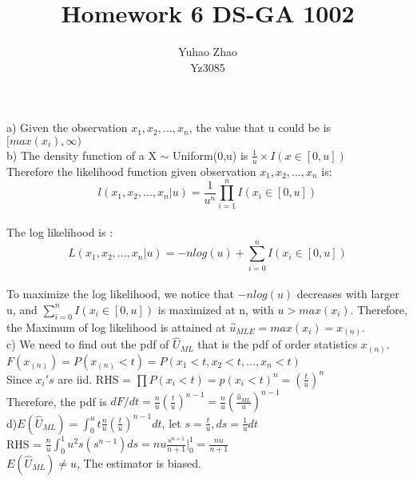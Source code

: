 \documentclass[11pt]{article}
\newenvironment{problem}[2][Problem]{\begin{trivlist}
\item[\hskip \labelsep {\bfseries #1}\hskip \labelsep {\bfseries #2.}]}{\end{trivlist}}
\begin{document}
 
 
\title{Homework 6 DS-GA 1002 }%
\author{Yuhao Zhao\\ %
Yz3085} %
 
\maketitle
\begin{problem}{1}
\end{problem}
a) Given the observation $x_1,x_2,...,x_n$, the value that u could be is $[max(x_i),\infty)$\\

b) The density function of a X $\sim$ Uniform(0,u) is $\frac{1}{u}\times I(x\in[0,u])$\\
Therefore the likelihood function given observation  $x_1,x_2,...,x_n$ is:$$l(x_1,x_2,...,x_n|u) = \frac{1}{u^n} \prod_{i=1}^{n} I(x_i \in [0,u])$$ \\
The log likelihood is :$$L(x_1,x_2,...,x_n|u) = -nlog(u) + \sum_{i=0}^{n} I(x_i \in [0,u]) $$\\
To maximize the log likelihood, we notice that $-nlog(u)$ decreases with larger u, and $\sum_{i=0}^{n} I(x_i \in [0,u])$ is maximized at n, with $u > max(x_i)$. Therefore, the Maximum of log likelihood is attained at  $\hat{u}_{MLE} = max(x_i) = x_{(n)}$.\\

c) We need to find out the pdf of $\hat{U}_{ML}$ that is the pdf of order statistics $x_{(n)}$.\\
$F(x_{(n)}) = P(x_{(n)} <t) = P(x_{1}<t,x_{2}<t,...,x_{n}<t)$\\
Since $x_i's$ are iid. RHS = $\prod P(x_i <t) = p(x_i <t)^n = (\frac{t}{u})^n$\\
Therefore, the pdf is $dF/dt = \frac{n}{u}(\frac{t}{u})^{n-1} =  \frac{n}{u}(\frac{\hat{u}_{ML}}{u})^{n-1} $\\

d)$E(\hat{U}_{ML}) = \int_{0}^{u} t \frac{n}{u}(\frac{t}{u})^{n-1}dt$, let $s = \frac{t}{u}, ds = \frac{1}{u}dt$\\
RHS = $\frac{n}{u}\int_{0}^{1} u^2s(s^{n-1})ds  = nu \frac{s^{n+1}}{n+1}|_0^1 = \frac{nu}{n+1}$\\
$E(\hat{U}_{ML}) \ne u$, The estimator is biased.\\
\end{document}
